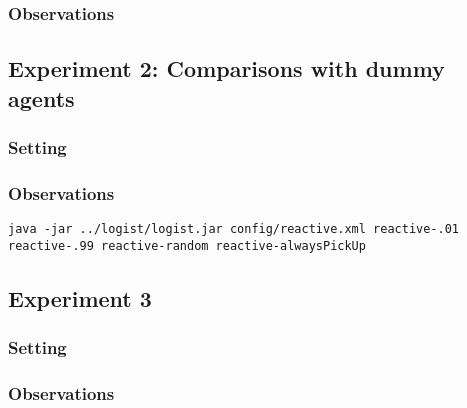 \documentclass[11pt]{article}
\begin{document}
\subsubsection{Observations}

\subsection{Experiment 2: Comparisons with dummy agents}

\subsubsection{Setting}

\subsubsection{Observations}

\begin{verbatim}
java -jar ../logist/logist.jar config/reactive.xml reactive-.01 reactive-.99 reactive-random reactive-alwaysPickUp
\end{verbatim}

\subsection{Experiment 3}

\subsubsection{Setting}



\subsubsection{Observations}
\end{document}
